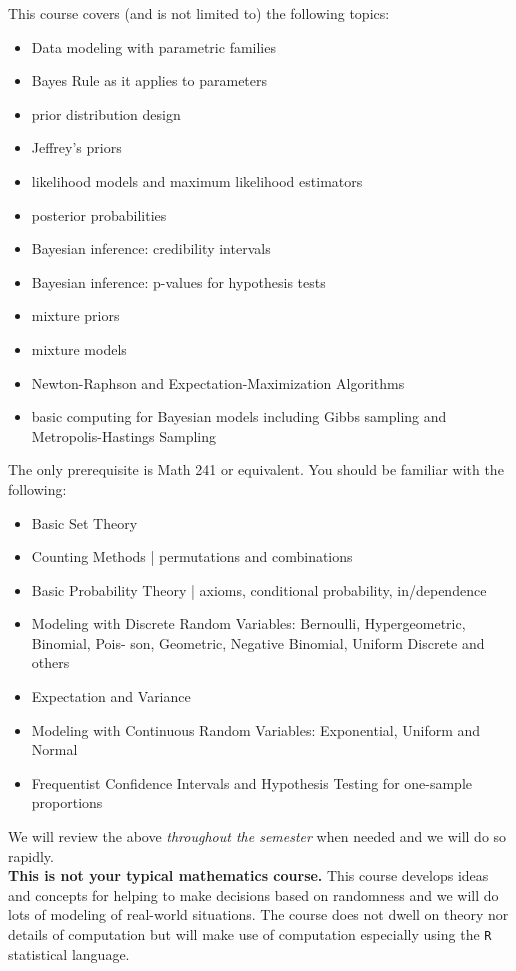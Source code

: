 \documentclass[12pt]{article}
\begin{document}
This course covers (and is not limited to) the following topics:


\begin{itemize}
\itemsep -0.0em 
\item Data modeling with parametric families
\item Bayes Rule as it applies to parameters
\item prior distribution design 
\item Jeffrey's priors 
\item likelihood models and maximum likelihood estimators
\item posterior probabilities 
\item Bayesian inference: credibility intervals 
\item Bayesian inference: p-values for hypothesis tests
\item mixture priors 
\item mixture models
\item Newton-Raphson and Expectation-Maximization Algorithms
\item basic computing for Bayesian models including Gibbs sampling and Metropolis-Hastings Sampling 
\end{itemize}

\noindent The only prerequisite is Math 241 or equivalent. You should be familiar with the following:

\begin{itemize}
\itemsep -0.0em 
\item Basic Set Theory
\item Counting Methods | permutations and combinations
\item Basic Probability Theory | axioms, conditional probability, in/dependence
\item Modeling with Discrete Random Variables: Bernoulli, Hypergeometric, Binomial, Pois-
son, Geometric, Negative Binomial, Uniform Discrete and others
\item Expectation and Variance
\item Modeling with Continuous Random Variables: Exponential, Uniform and Normal
\item Frequentist Confidence Intervals and Hypothesis Testing for one-sample proportions
\end{itemize}

\noindent We will review the above \textit{throughout the semester} when needed and we will do so rapidly. \\

\textbf{This is not your typical mathematics course.} This course develops ideas and concepts for helping to make decisions based on randomness and we will do lots of modeling of real-world situations. The course does not dwell on theory nor details of computation but will make use of computation especially using the \texttt{R} statistical language.
\end{document}
